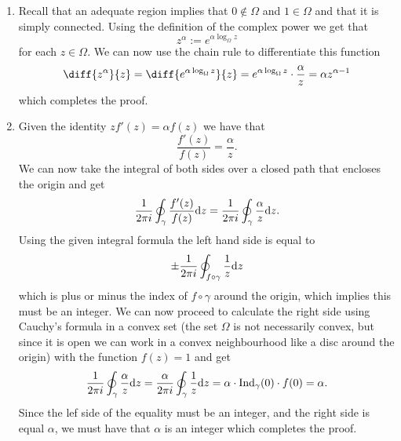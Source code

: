 \documentclass[11pt,a4paper]{article}
\begin{document}
\begin{solution} \phantom{}
\begin{enumerate}
  \item[(1)] Recall that an adequate region implies that $0 \notin \Omega$
    and $1 \in \Omega$ and that it is simply connected.
    Using the definition of the complex power we get that
    \[
      z^{\alpha} := e^{\alpha \log_{\Omega} z}
    \]
    for each $z \in \Omega$.
    We can now use the chain rule to differentiate this function
    \[
      \diff{z^{\alpha}}{z} =
      \diff{e^{\alpha \log_{\Omega} z}}{z} =
      e^{\alpha \log_{\Omega} z} \cdot \frac{\alpha}{z} =
      \alpha z^{\alpha - 1}
    \]
    which completes the proof.
  \item[(2)] Given the identity $z f'(z) = \alpha f(z)$ we have that
    \[
      \frac{f'(z)}{f(z)} = \frac{\alpha}{z}.
    \]
    We can now take the integral of both sides over a closed path
    that encloses the origin and get
    \[
      \frac{1}{2 \pi i} \oint_{\gamma} \frac{f'(z)}{f(z)} \mathrm{d} z =
      \frac{1}{2 \pi i} \oint_{\gamma} \frac{\alpha}{z} \mathrm{d} z.
    \]
    Using the given integral formula the left hand side is equal to
    \[
      \pm \frac{1}{2 \pi i} \oint_{f \circ \gamma} \frac{1}{z} \mathrm{d} z
    \]
    which is plus or minus the index of $f \circ \gamma$ around the origin,
    which implies this must be an integer.
    We can now proceed to calculate the right side
    using Cauchy's formula in a convex set (the set $\Omega$ is not
    necessarily convex, but since it is open we can work in a convex
    neighbourhood like a disc around the origin) with the function
    $f(z) = 1$ and get
    \[
      \frac{1}{2 \pi i} \oint_{\gamma} \frac{\alpha}{z} \mathrm{d} z =
      \frac{\alpha}{2 \pi i} \oint_{\gamma} \frac{1}{z} \mathrm{d} z =
      \alpha \cdot \operatorname{Ind}_{\gamma}(0) \cdot f(0) = \alpha.
    \]
    Since the lef side of the equality must be an integer,
    and the right side is equal $\alpha$, we must have that
    $\alpha$ is an integer which completes the proof.
\end{enumerate}
\end{solution}
\end{document}
